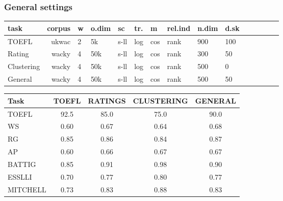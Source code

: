 \documentclass[t]{beamer} %
\begin{document}
\begin{frame}
  \frametitle{General settings}

  \ungap[1]
  \begin{center}
    \setlength{\tabcolsep}{3.5pt}
    \footnotesize
    \begin{tabular}{lrllllllllllllr}
      \hline
      task & corpus & w &  o.dim & sc & tr. & m  & rel.ind  & n.dim  & d.sk \\  
      \hline 
      TOEFL & ukwac & 2 &  5k & s-ll & log & cos & rank  & 900 & 100 \\   
      Rating & wacky & 4 & 50k & s-ll & log & cos & rank  & 300 & 50 \\  
      Clustering & wacky & 4 & 50k & s-ll & log  & cos & rank & 500 & 0 \\ 
      General & wacky & 4 & 50k & s-ll & log  & cos & rank & 500 & 50 \\ \hline 
    \end{tabular}

    \gap[1]

    \gap[2]
    \begin{tabular}{lccc>{\color{secondary}}c}
      \hline
      Task & TOEFL &  RATINGS &   CLUSTERING &  GENERAL  \\  
      \hline 
      TOEFL & 92.5 & 85.0  & 75.0 & 90.0   \\  
      WS & 0.60 & 0.67 & 0.64  & 0.68 \\  
      RG & 0.85 & 0.86  & 0.84 &  0.87 \\  
      AP & 0.60 & 0.66 & 0.67 & 0.67 \\  
      BATTIG & 0.85   & 0.91 & 0.98 & 0.90  \\  
      ESSLLI & 0.70 & 0.77  & 0.80 & 0.77  \\  
      MITCHELL & 0.73 & 0.83 &  0.88 & 0.83 \\ \hline     
    \end{tabular}

    \gap[1]
  \end{center}
  
\end{frame}
\end{document}

